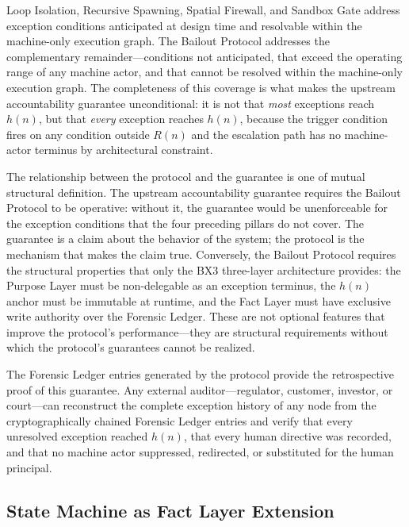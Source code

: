 Loop Isolation, Recursive Spawning, Spatial Firewall, and Sandbox Gate address
exception conditions anticipated at design time and resolvable within the
machine-only execution graph.  The Bailout Protocol addresses the complementary
remainder---conditions not anticipated, that exceed the operating range of any
machine actor, and that cannot be resolved within the machine-only execution
graph.  The completeness of this coverage is what makes the upstream
accountability guarantee unconditional: it is not that \emph{most} exceptions
reach $h(n)$, but that \emph{every} exception reaches $h(n)$, because the trigger
condition fires on any condition outside $R(n)$ and the escalation path has no
machine-actor terminus by architectural constraint.

The relationship between the protocol and the guarantee is one of mutual
structural definition.  The upstream accountability guarantee requires the
Bailout Protocol to be operative: without it, the guarantee would be
unenforceable for the exception conditions that the four preceding pillars do not
cover.  The guarantee is a claim about the behavior of the system; the protocol
is the mechanism that makes the claim true.  Conversely, the Bailout Protocol
requires the structural properties that only the BX3 three-layer architecture
provides: the Purpose Layer must be non-delegable as an exception terminus, the
$h(n)$ anchor must be immutable at runtime, and the Fact Layer must have
exclusive write authority over the Forensic Ledger.  These are not optional
features that improve the protocol's performance---they are structural
requirements without which the protocol's guarantees cannot be realized.

The Forensic Ledger entries generated by the protocol provide the retrospective
proof of this guarantee.  Any external auditor---regulator, customer, investor,
or court---can reconstruct the complete exception history of any node from the
cryptographically chained Forensic Ledger entries and verify that every unresolved
exception reached $h(n)$, that every human directive was recorded, and that no
machine actor suppressed, redirected, or substituted for the human principal.

\subsection{State Machine as Fact Layer Extension}
\label{sec:bailout-state-machine}

